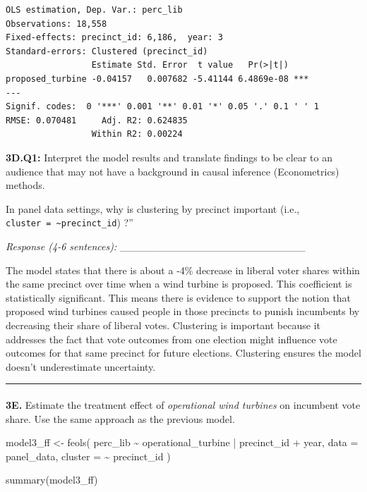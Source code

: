 \documentclass[
  letterpaper,
  DIV=11,
  numbers=noendperiod]{scrartcl}
\makeatletter
\let\oldparagraph\paragraph
\renewcommand{\paragraph}{
    \@ifstar
      \xxxParagraphStar
      \xxxParagraphNoStar
  }
\newcommand{\xxxParagraphStar}[1]{\oldparagraph*{#1}\mbox{}}
\newcommand{\xxxParagraphNoStar}[1]{\oldparagraph{#1}\mbox{}}
\newenvironment{Shaded}{\begin{snugshade}}{\end{snugshade}}
\newcommand{\AttributeTok}[1]{\textcolor[rgb]{0.40,0.45,0.13}{#1}}
\newcommand{\FunctionTok}[1]{\textcolor[rgb]{0.28,0.35,0.67}{#1}}
\newcommand{\NormalTok}[1]{\textcolor[rgb]{0.00,0.23,0.31}{#1}}
\newcommand{\OtherTok}[1]{\textcolor[rgb]{0.00,0.23,0.31}{#1}}
\newcommand{\SpecialCharTok}[1]{\textcolor[rgb]{0.37,0.37,0.37}{#1}}
\makeatother
\begin{document}
\begin{verbatim}
OLS estimation, Dep. Var.: perc_lib
Observations: 18,558
Fixed-effects: precinct_id: 6,186,  year: 3
Standard-errors: Clustered (precinct_id) 
                 Estimate Std. Error  t value   Pr(>|t|)    
proposed_turbine -0.04157   0.007682 -5.41144 6.4869e-08 ***
---
Signif. codes:  0 '***' 0.001 '**' 0.01 '*' 0.05 '.' 0.1 ' ' 1
RMSE: 0.070481     Adj. R2: 0.624835
                 Within R2: 0.00224 
\end{verbatim}

\textbf{3D.Q1:} Interpret the model results and translate findings to be
clear to an audience that may not have a background in causal inference
(Econometrics) methods.

In panel data settings, why is clustering by precinct important (i.e.,
\texttt{cluster\ =\ \textasciitilde{}precinct\_id}) ?''

\emph{Response (4-6 sentences):}
\_\_\_\_\_\_\_\_\_\_\_\_\_\_\_\_\_\_\_\_\_\_\_\_\_

The model states that there is about a -4\% decrease in liberal voter
shares within the same precinct over time when a wind turbine is
proposed. This coefficient is statistically significant. This means
there is evidence to support the notion that proposed wind turbines
caused people in those precincts to punish incumbents by decreasing
their share of liberal votes. Clustering is important because it
addresses the fact that vote outcomes from one election might influence
vote outcomes for that same precinct for future elections. Clustering
ensures the model doesn't underestimate uncertainty.

\begin{center}\rule{0.5\linewidth}{0.5pt}\end{center}

\paragraph{\texorpdfstring{\textbf{3E.} Estimate the treatment effect of
\emph{operational wind turbines} on incumbent vote share. Use the same
approach as the previous
model.}{3E. Estimate the treatment effect of operational wind turbines on incumbent vote share. Use the same approach as the previous model.}}\label{e.-estimate-the-treatment-effect-of-operational-wind-turbines-on-incumbent-vote-share.-use-the-same-approach-as-the-previous-model.}

\begin{Shaded}
\begin{Highlighting}[]
\NormalTok{model3\_ff }\OtherTok{\textless{}{-}} \FunctionTok{feols}\NormalTok{(}
\NormalTok{  perc\_lib }\SpecialCharTok{\textasciitilde{}}\NormalTok{ operational\_turbine }\SpecialCharTok{|}\NormalTok{ precinct\_id }\SpecialCharTok{+}\NormalTok{ year,}
  \AttributeTok{data =}\NormalTok{ panel\_data, }
  \AttributeTok{cluster =} \SpecialCharTok{\textasciitilde{}}\NormalTok{ precinct\_id}
\NormalTok{)}

\FunctionTok{summary}\NormalTok{(model3\_ff)}
\end{Highlighting}
\end{Shaded}
\end{document}
